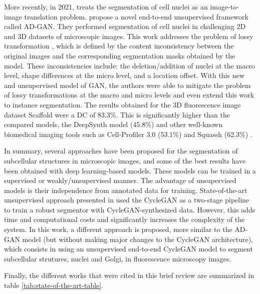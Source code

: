 More recently, in 2021, \cite{adgan} treats the segmentation of cell nuclei as an image-to-image translation problem. \citet{adgan} propose a novel end-to-end unsupervised framework called \ac{AD-GAN}. They performed segmentation of cell nuclei in challenging \ac{2D} and \ac{3D} datasets of microscopic images. This work addresses the problem of lossy transformation \cite{lossy:cyclegan}, which is defined by the content inconsistency between the original images and the corresponding segmentation masks obtained by the model. These inconsistencies include: the deletion/addition of nuclei at the macro level, shape differences at the micro level, and a location offset. With this new and unsupervised model of \ac{GAN}, the authors were able to mitigate the problem of lossy transformations at the macro and micro levels and even extend this work to instance segmentation. The results obtained for the \ac{3D} fluorescence image dataset Scaffold \cite{dataset} were a \ac{DC} of 83.3\%. This is significantly higher than the compared models, the DeepSynth model \cite{deepsynth} (45.8\%) and other well-known biomedical imaging tools such as Cell-Profiler 3.0 \cite{cellprofiler} (53.1\%) and Squassh (62.3\%) \cite{squassh}. 

In summary, several approaches have been proposed for the segmentation of subcellular structures in microscopic images, and some of the best results have been obtained with deep learning-based models. These models can be trained in a supervised or weakly/unsupervised manner. The advantage of unsupervised models is their independence from annotated data for training. State-of-the-art unsupervised approach presented in \cite{deepsynth} used the CycleGAN as a two-stage pipeline to train a robust segmentor with CycleGAN-synthesized data. However, this adds time and computational costs and significantly increases the complexity of the system. In this work, a different approach is proposed, more similar to the \ac{AD-GAN} model (but without making major changes to the CycleGAN architecture), which consists in using an unsupervised end-to-end CycleGAN model to segment subcellular strutures, nuclei and Golgi, in fluorescence microscopy images. 

Finally, the different works that were cited in this brief review are summarized in table \ref{tab:state-of-the-art-table}.

